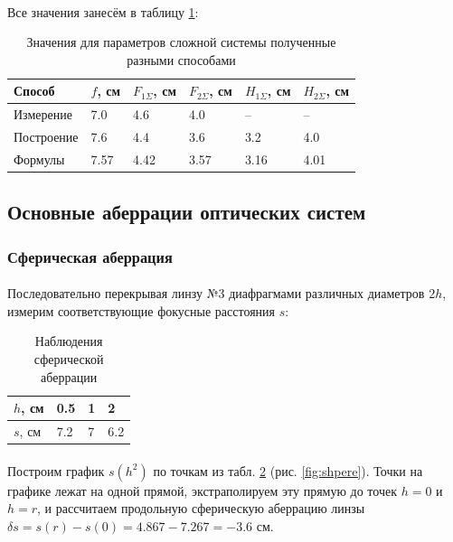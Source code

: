 \documentclass[a4paper,12pt]{article} %
\begin{document}
\paragraph{} Все значения занесём в таблицу \ref{tab:ways}:

\begin{table}[h]
\centering
\begin{tabular}{|l|l|l|l|l|l|}
\hline
Способ & $f$, см & $F_{1\Sigma}$, см & $F_{2\Sigma}$, см & $H_{1\Sigma}$, см & $H_{2\Sigma}$, см \\ \hline
Измерение  & 7.0  & 4.6  & 4.0  & --   & --   \\ \hline
Построение & 7.6  & 4.4  & 3.6  & 3.2  & 4.0  \\ \hline
Формулы    & 7.57 & 4.42 & 3.57 & 3.16 & 4.01 \\ \hline
\end{tabular}
\caption{Значения для параметров сложной системы полученные разными способами}
\label{tab:ways}
\end{table}

\subsection{Основные аберрации оптических систем}

\subsubsection{Сферическая аберрация}

\paragraph{} Последовательно перекрывая линзу №3 диафрагмами различных диаметров $2h$, измерим соответствующие фокусные расстояния $s$:

\begin{table}[h]
\centering
\begin{tabular}{|l|l|l|l|}
\hline
$h$, см & 0.5 & 1 & 2   \\ \hline
$s$, см & 7.2 & 7 & 6.2 \\ \hline
\end{tabular}
\caption{Наблюдения сферической аберрации}
\label{tab:shpere}
\end{table}

\paragraph{} Построим график $s(h^2)$ по точкам из табл. \ref{tab:shpere} (рис. \ref{fig:shpere}). Точки на графике лежат на одной прямой, экстраполируем эту прямую до точек $h = 0$ и $h = r$, и рассчитаем продольную сферическую аберрацию линзы $\delta s = s(r) - s(0) = 4.867 - 7.267 = -3.6$ см.
\end{document}
